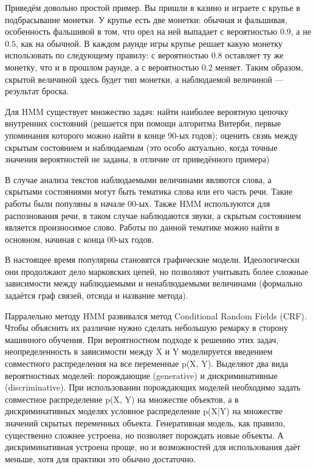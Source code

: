 \documentclass[a4paper,14pt]{extarticle}
\begin{document}
Приведём довольно простой пример. Вы пришли в казино и играете с крупье в подбрасывание монетки. У крупье есть две монетки: обычная и фальшивая, особенность фальшивой в том, что орел на ней выпадает с вероятностью $0.9$, а не $0.5$, как на обычной. В каждом раунде игры крупье решает какую монетку использовать по следующему правилу: с вероятностью $0.8$ оставляет ту же монетку, что и в прошлом раунде, а с вероятностью $0.2$ меняет. Таким образом, скрытой величиной здесь будет тип монетки, а наблюдаемой величиной --- результат броска.

Для HMM существует множество задач: найти наиболее вероятную цепочку внутренних состояний (решается при помощи алгоритма Витерби, первые упоминания которого можно найти в конце 90-ых годов); оценить свзяь между скрытым состоянием и наблюдаемым (это особо актуально, когда точные значения вероятностей не заданы, в отличие от приведённого примера)

В случае анализа текстов наблюдаемыми величинами являются слова, а  скрытыми состояниями могут быть тематика слова или его часть речи. Такие работы были популяны в начале 00-ых. Также HMM используются  для распознования речи, в таком случае наблюдаются звуки, а скрытым состоянием является произносимое слово. Работы по данной тематике можно найти в основном, начиная с конца 00-ых годов.

В настоящее время популярны становятся графические модели. Идеологически они продолжают дело марковских цепей, но позволяют учитывать более сложные зависимости между наблюдаемыми и ненаблюдаемыми величинами (формально задаётся граф связей, отсюда и название метода).

Парралельно методу HMM развивался метод Conditional Random Fields (CRF). Чтобы объяснить их различие нужно сделать небольшую ремарку в сторону машинного обучения. При вероятностном подходе к решению этих задач, неопределенность в зависимости между X и Y моделируется введением совместного распределения на все переменные p(X, Y). Выделяют два вида вероятностных моделей: порождающие (generative) и дискриминативные (discriminative). При использовании порождающих моделей необходимо задать совместное распределение p(X, Y) на множестве
объектов, а в дискриминативных моделях  условное распределение p(X|Y) на множестве значений скрытых переменных объекта. Генеративная модель, как правило, существенно сложнее устроена, но позволяет порождать новые объекты. А дискриминативная устроена проще, но и возможностей для использования даёт меньше, хотя для практики это обычно достаточно.
\end{document}

